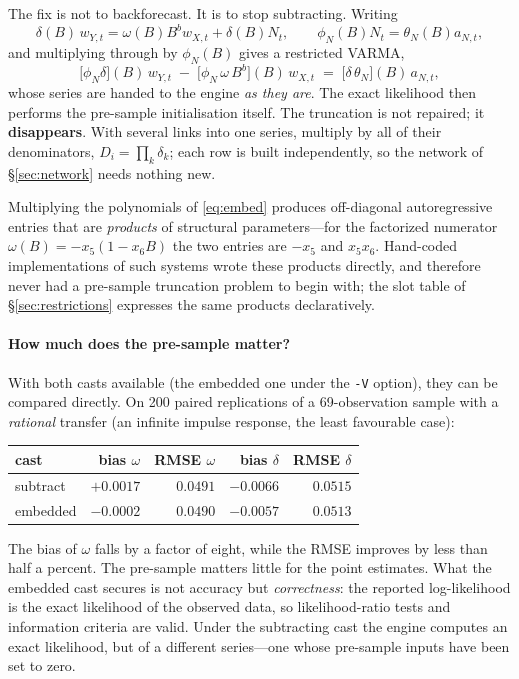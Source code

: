 \documentclass[11pt,a4paper]{article}
\theoremstyle{plain}
\theoremstyle{remark}
\begin{document}
The fix is not to backforecast. It is to stop subtracting. Writing
\[
\delta(B)\,w_{Y,t}=\omega(B)B^{b} w_{X,t}+\delta(B)N_t,
\qquad \phi_N(B)N_t=\theta_N(B)a_{N,t},
\]
and multiplying through by $\phi_N(B)$ gives a restricted VARMA,
\begin{equation}
\bigl[\phi_N\delta\bigr](B)\,w_{Y,t}
\;-\;\bigl[\phi_N\,\omega\,B^{b}\bigr](B)\,w_{X,t}
\;=\;\bigl[\delta\,\theta_N\bigr](B)\,a_{N,t},
\label{eq:embed}
\end{equation}
whose series are handed to the engine \emph{as they are}. The exact likelihood then
performs the pre-sample initialisation itself. The truncation is not repaired; it
\textbf{disappears}. With several links into one series, multiply by all of their
denominators, $D_i=\prod_k\delta_k$; each row is built independently, so the network
of \S\ref{sec:network} needs nothing new.

Multiplying the polynomials of \eqref{eq:embed} produces off-diagonal
autoregressive entries that are \emph{products} of structural parameters---for the
factorized numerator $\omega(B)=-x_5(1-x_6B)$ the two entries are $-x_5$ and
$x_5x_6$. Hand-coded implementations of such systems wrote these products directly,
and therefore never had a pre-sample truncation problem to begin with; the slot
table of \S\ref{sec:restrictions} expresses the same products declaratively.

\paragraph{How much does the pre-sample matter?} With both casts available (the
embedded one under the \texttt{-V} option), they can be compared directly. On 200
paired replications of a 69-observation sample with a \emph{rational} transfer (an
infinite impulse response, the least favourable case):

\begin{center}
\begin{tabular}{lrrrr}
\toprule
cast & bias $\omega$ & RMSE $\omega$ & bias $\delta$ & RMSE $\delta$\\
\midrule
subtract & $+0.0017$ & $0.0491$ & $-0.0066$ & $0.0515$\\
embedded & $\mathbf{-0.0002}$ & $0.0490$ & $-0.0057$ & $0.0513$\\
\bottomrule
\end{tabular}
\end{center}

The bias of $\omega$ falls by a factor of eight, while the RMSE improves by less
than half a percent. The pre-sample matters little for the point estimates. What
the embedded cast secures is not accuracy but \emph{correctness}: the reported
log-likelihood is the exact likelihood of the observed data, so likelihood-ratio
tests and information criteria are valid. Under the subtracting cast the engine
computes an exact likelihood, but of a different series---one whose pre-sample
inputs have been set to zero.
\end{document}
